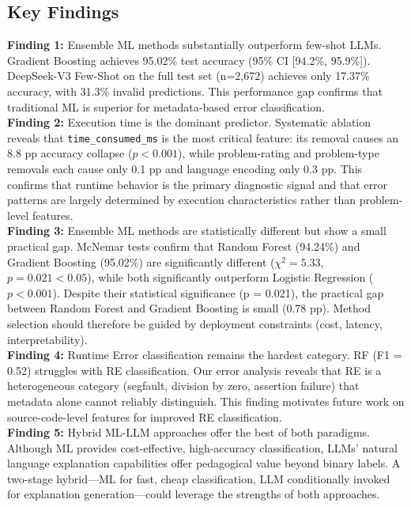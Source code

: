 \documentclass[10pt,a4paper]{article}
\begin{document}
\subsection*{Key Findings}
\begin{flushleft}
\textbf{Finding 1:} Ensemble ML methods substantially outperform few-shot LLMs. Gradient Boosting achieves 95.02\% test accuracy (95\% CI [94.2\%, 95.9\%]). DeepSeek-V3 Few-Shot on the full test set (n=2,672) achieves only 17.37\% accuracy, with 31.3\% invalid predictions. This performance gap confirms that traditional ML is superior for metadata-based error classification.\\
\textbf{Finding 2:} Execution time is the dominant predictor. Systematic ablation reveals that \texttt{time\_consumed\_ms} is the most critical feature: its removal causes an 8.8 pp accuracy collapse ($p < 0.001$), while problem-rating and problem-type removals each cause only 0.1 pp and language encoding only 0.3 pp. This confirms that runtime behavior is the primary diagnostic signal and that error patterns are largely determined by execution characteristics rather than problem-level features.\\
\textbf{Finding 3:} Ensemble ML methods are statistically different but show a small practical gap. McNemar tests confirm that Random Forest (94.24\%) and Gradient Boosting (95.02\%) are significantly different ($\chi^2 = 5.33$, $p = 0.021 < 0.05$), while both significantly outperform Logistic Regression ($p < 0.001$). Despite their statistical significance (p = 0.021), the practical gap between Random Forest and Gradient Boosting is small (0.78 pp). Method selection should therefore be guided by deployment constraints (cost, latency, interpretability).\\
\textbf{Finding 4:} Runtime Error classification remains the hardest category. RF (F1 = 0.52) struggles with RE classification. Our error analysis reveals that RE is a heterogeneous category (segfault, division by zero, assertion failure) that metadata alone cannot reliably distinguish. This finding motivates future work on source-code-level features for improved RE classification.\\
\textbf{Finding 5:} Hybrid ML-LLM approaches offer the best of both paradigms. Although ML provides cost-effective, high-accuracy classification, LLMs' natural language explanation capabilities offer pedagogical value beyond binary labels. A two-stage hybrid---ML for fast, cheap classification, LLM conditionally invoked for explanation generation---could leverage the strengths of both approaches.\\
\end{flushleft}
\end{document}
